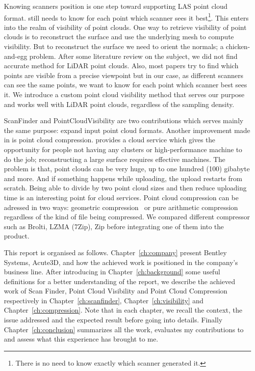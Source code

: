 Knowing scanners position is one step toward supporting LAS point cloud format. \CC still needs to know for each point which scanner sees it best\footnote{There is no need to know exactly which scanner generated it.}. This enters into the realm of visibility of point clouds. One way to retrieve visibility of point clouds is to reconstruct the surface and use the underlying mesh to compute visibility. But to reconstruct the surface we need to orient the normals; a chicken-and-egg problem. After some literature review on the subject, we did not find accurate method for LiDAR point clouds. Also, most papers try to find which points are visible from a precise viewpoint but in our case, as different scanners can see the same points, we want to know for each point which scanner best sees it. We introduce a custom point cloud visibility method that serves our purpose and works well with LiDAR point clouds, regardless of the sampling density.

ScanFinder and PointCloudVisibility are two contributions which serves mainly the same purpose: expand \CC input point cloud formats. Another improvement made in \CC is point cloud compression. \CC provides a cloud service which gives the opportunity for people not having any clusters or high-performance machine to do the job; reconstructing a large surface requires effective machines. The problem is that, point clouds can be very huge, up to one hundred (100) gibabyte and more. And if something happens while uploading, the upload restarts from scratch. Being able to divide by two point cloud sizes and then reduce uploading time is an interesting point for \CC cloud services. Point cloud compression can be adressed in two ways: geometric compression~\cite{compress1, compress2} or pure arithmetic compression regardless of the kind of file being compressed. We compared different compressor such as Brolti, LZMA (7Zip), Zip before integrating one of them into the product.

This report is organised as follows. Chapter~\ref{ch:company} present Bentley Systems, Acute3D, \CC and how the achieved work is positioned in the company's business line. After introducing in Chapter~\ref{ch:background} some useful definitions for a better understanding of the report, we describe the achieved work of Scan Finder, Point Cloud Visibility and Point Cloud Compression respectively in Chapter~\ref{ch:scanfinder}, Chapter~\ref{ch:visibility} and
Chapter~\ref{ch:compression}. Note that in each chapter, we recall the context, the issue addressed and the expected result before going into details. Finally Chapter~\ref{ch:conclusion} summarizes all the work, evaluates my contributions to \CC and assess what this experience has brought to me.